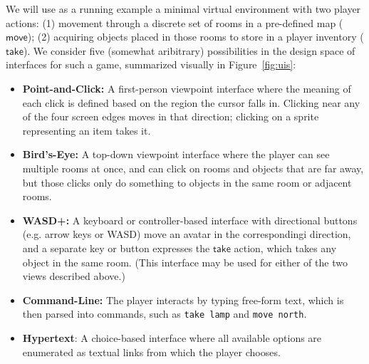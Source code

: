   \newcommand{\cmove}{\mathsf{move}}
  \newcommand{\ctake}{\mathsf{take}}
  \newcommand{\ccollect}{\mathsf{collect}}

  We will use as a running example a minimal virtual environment with two
  player actions: (1) movement through a discrete set of rooms in a
  pre-defined map ($\cmove$); (2) acquiring objects placed in those rooms to store in
  a player inventory ($\ctake$).  We consider five (somewhat aribitrary)
  possibilities in the design space of interfaces for such a game,
  summarized visually in Figure~\ref{fig:uis}:

  \begin{itemize}
   \item {\bf Point-and-Click:} A first-person viewpoint interface where the
     meaning of each click is defined based on the region the cursor falls
     in. Clicking near any of the four screen edges moves in that
     direction; clicking on a sprite representing an item takes it.
  \item {\bf Bird's-Eye:} A top-down viewpoint interface where the player can see multiple
    rooms at once, and can click on rooms and objects that are far away,
    but those clicks only do something to objects in the same room or
    adjacent rooms.
  \item {\bf WASD+:} A keyboard or controller-based interface with
    directional buttons (e.g. arrow keys or WASD) move an avatar in the
    correspondingi direction, and a separate key or button expresses
    the $\ctake$ action, which takes any object in the same room. (This
    interface may be used for either of the two views described above.)
  \item{\bf Command-Line:} The player interacts by typing free-form text, 
    which is then parsed into commands, such as \verb|take lamp| and \verb|move north|.
  \item{\bf Hypertext}: A choice-based interface where all available options are
    enumerated as textual links from which the player chooses.
  \end{itemize}

